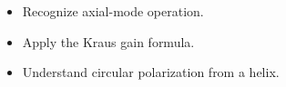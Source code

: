 \begin{objectives}
\begin{itemize}[leftmargin=1.4em,itemsep=2pt]
\item Recognize axial-mode operation.
\item Apply the Kraus gain formula.
\item Understand circular polarization from a helix.
\end{itemize}
\end{objectives}
